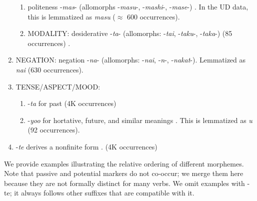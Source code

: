 \documentclass[11pt,letterpaper]{article}
\begin{document}
\begin{enumerate}
\begin{enumerate}
\item politeness -\textit{mas}- (allomorphs -\textit{masu}-, -\textit{mashi}-, -\textit{mase}-) \cite[190]{kaiser2013japanese}. %
In the UD data, this is lemmatized as \textit{masu} ($\approx$ 600 occurrences).
\item MODALITY: desiderative -\textit{ta}- (allomorphs: -\textit{tai}, -\textit{taku}-, -\textit{taka}-) (85 occurrences) \cite[238]{kaiser2013japanese}. %
\end{enumerate}
\item NEGATION: negation -\textit{na}- (allomorphs: -\textit{nai}, -\textit{n}-, -\textit{nakat}-). 
Lemmatized as \textit{nai} (630 occurrences).
\item TENSE/ASPECT/MOOD:
\begin{enumerate}
\item -\textit{ta} for past (4K occurrences) \cite[211]{kaiser2013japanese}
\item -\textit{yoo} for hortative, future, and similar meanings \cite[229]{kaiser2013japanese}. This is lemmatized as \textit{u} (92 occurrences).
\end{enumerate}
\item -\textit{te} derives a nonfinite form \cite[186]{kaiser2013japanese}. (4K occurrences)
\end{enumerate}






We provide examples illustrating the relative ordering of different morphemes.
Note that passive and potential markers do not co-occur; we merge them here because they are not formally distinct for many verbs.
We omit examples with -te; it always follows other suffixes that are compatible with it.
\end{document}
